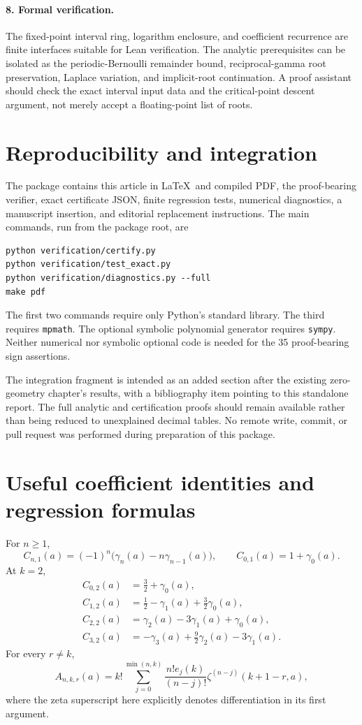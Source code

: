 \documentclass[11pt]{article}
\numberwithin{equation}{section}
\theoremstyle{definition}\newtheorem{definition}[theorem]{Definition}
\theoremstyle{remark}\newtheorem{remark}[theorem]{Remark}
\begin{document}
\paragraph{8. Formal verification.}
The fixed-point interval ring, logarithm enclosure, and coefficient recurrence are finite interfaces suitable for Lean verification. The analytic prerequisites can be isolated as the periodic-Bernoulli remainder bound, reciprocal-gamma root preservation, Laplace variation, and implicit-root continuation. A proof assistant should check the exact interval input data and the critical-point descent argument, not merely accept a floating-point list of roots.

\section{Reproducibility and integration}\label{sec:repro}
The package contains this article in \LaTeX\ and compiled PDF, the proof-bearing verifier, exact certificate JSON, finite regression tests, numerical diagnostics, a manuscript insertion, and editorial replacement instructions. The main commands, run from the package root, are
\begin{verbatim}
python verification/certify.py
python verification/test_exact.py
python verification/diagnostics.py --full
make pdf
\end{verbatim}
The first two commands require only Python's standard library. The third requires \texttt{mpmath}. The optional symbolic polynomial generator requires \texttt{sympy}. Neither numerical nor symbolic optional code is needed for the 35 proof-bearing sign assertions.

The integration fragment is intended as an added section after the existing zero-geometry chapter's results, with a bibliography item pointing to this standalone report. The full analytic and certification proofs should remain available rather than being reduced to unexplained decimal tables. No remote write, commit, or pull request was performed during preparation of this package.

\appendix
\section{Useful coefficient identities and regression formulas}\label{app:identities}
For $n\geq1$,
\[
C_{n,1}(a)=(-1)^n\bigl(\gamma_n(a)-n\gamma_{n-1}(a)\bigr),
\qquad C_{0,1}(a)=1+\gamma_0(a).
\]
At $k=2$,
\begin{align*}
C_{0,2}(a)&=\tfrac32+\gamma_0(a),\\
C_{1,2}(a)&=\tfrac12-\gamma_1(a)+\tfrac32\gamma_0(a),\\
C_{2,2}(a)&=\gamma_2(a)-3\gamma_1(a)+\gamma_0(a),\\
C_{3,2}(a)&=-\gamma_3(a)+\tfrac92\gamma_2(a)-3\gamma_1(a).
\end{align*}
For every $r\ne k$,
\[
A_{n,k,r}(a)=k!\sum_{j=0}^{\min(n,k)}\frac{n!e_j(k)}{(n-j)!}
\zeta^{(n-j)}(k+1-r,a),
\]
where the zeta superscript here explicitly denotes differentiation in its first argument.
\end{document}
